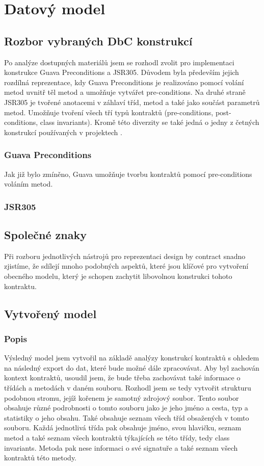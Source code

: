 \chapter{Datový model}
	\section{Rozbor vybraných DbC konstrukcí}
		Po analýze dostupných materiálů jsem se rozhodl zvolit pro implementaci konstrukce Guava Preconditions a JSR305. Důvodem byla především jejich rozdílná reprezentace, kdy Guava Preconditions je realizováno pomocí volání metod uvnitř těl metod a umožňuje vytvářet pre-conditions. Na druhé straně JSR305 je tvořené anotacemi v záhlaví tříd, metod a také jako součást parametrů metod. Umožňuje tvoření všech tří typů kontraktů (pre-conditions, post-conditions, class invariants). Kromě této diverzity se také jedná o jedny z četných konstrukcí používaných v projektech \cite{contractsInWild}.
			
		\subsection{Guava Preconditions}
			Jak již bylo zmíněno, Guava umožňuje tvorbu kontraktů pomocí pre-conditions voláním metod. 
		
		\subsection{JSR305}
	
	\section{Společné znaky}		
		Při rozboru jednotlivých nástrojů pro reprezentaci design by contract snadno zjistíme, že sdílejí mnoho podobných aspektů, které jsou klíčové pro vytvoření obecného modelu, který je schopen zachytit libovolnou konstrukci tohoto kontraktu. 
	
	\section{Vytvořený model}
		\subsection{Popis}
			Výsledný model jsem vytvořil na základě analýzy konstrukcí kontraktů s ohledem na následný export do dat, které bude možné dále zpracovávat. Aby byl zachován kontext kontraktů, usoudil jsem, že bude třeba zachovávat také informace o třídách a metodách v daném souboru. Rozhodl jsem se tedy vytvořit strukturu podobnou stromu, jejíž kořenem je samotný zdrojový soubor. Tento soubor obsahuje různé podrobnosti o tomto souboru jako je jeho jméno a cesta, typ a statistiky o jeho obsahu. Také obsahuje seznam všech tříd obsažených v tomto souboru.
			Každá jednotlivá třída pak obsahuje jméno, svou hlavičku, seznam metod a také seznam všech kontraktů týkajících se této třídy, tedy class invariants. Metoda pak nese informaci o své signatuře a také seznam všech kontraktů této metody.
			
